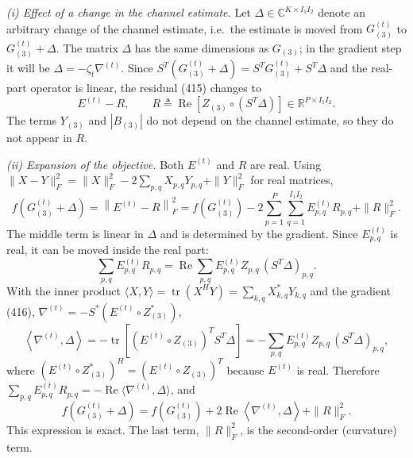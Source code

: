 \documentclass[12pt,a4paper]{article}
\begin{document}
\emph{(i) Effect of a change in the channel estimate.} Let
$\Delta\in\mathbb C^{K\times I_1I_2}$ denote an arbitrary change of the
channel estimate, i.e.\ the estimate is moved from $G_{(3)}^{(t)}$ to
$G_{(3)}^{(t)}+\Delta$. The matrix $\Delta$ has the same dimensions as
$G_{(3)}$; in the gradient step it will be $\Delta=-\zeta_t\nabla^{(t)}$.
Since $S^T(G_{(3)}^{(t)}+\Delta)=S^TG_{(3)}^{(t)}+S^T\Delta$ and the real-part
operator is linear, the residual (415) changes to
\[
E^{(t)}-R,
\qquad
R\triangleq\operatorname{Re}\!\left[Z_{(3)}\circ(S^T\Delta)\right]
\in\mathbb R^{P\times I_1I_2}.
\]
The terms $Y_{(3)}$ and $|B_{(3)}|$ do not depend on the channel estimate, so
they do not appear in $R$.

\emph{(ii) Expansion of the objective.} Both $E^{(t)}$ and $R$ are real.
Using $\|X-Y\|_F^2=\|X\|_F^2-2\sum_{p,q}X_{p,q}Y_{p,q}+\|Y\|_F^2$ for real
matrices,
\[
f\!\left(G_{(3)}^{(t)}+\Delta\right)
=\left\|E^{(t)}-R\right\|_F^2
=f\!\left(G_{(3)}^{(t)}\right)
-2\sum_{p=1}^{P}\sum_{q=1}^{I_1I_2}E^{(t)}_{p,q}R_{p,q}
+\|R\|_F^2 .
\]
The middle term is linear in $\Delta$ and is determined by the gradient. Since
$E^{(t)}_{p,q}$ is real, it can be moved inside the real part:
\[
\sum_{p,q}E^{(t)}_{p,q}R_{p,q}
=\operatorname{Re}\sum_{p,q}E^{(t)}_{p,q}Z_{p,q}\,(S^T\Delta)_{p,q}.
\]
With the inner product $\langle X,Y\rangle=\operatorname{tr}(X^HY)
=\sum_{k,q}X_{k,q}^{*}Y_{k,q}$ and the gradient (416),
$\nabla^{(t)}=-S^{*}(E^{(t)}\circ Z_{(3)}^{*})$,
\[
\left\langle\nabla^{(t)},\Delta\right\rangle
=-\operatorname{tr}\!\left[(E^{(t)}\circ Z_{(3)})^{T}S^T\Delta\right]
=-\sum_{p,q}E^{(t)}_{p,q}Z_{p,q}\,(S^T\Delta)_{p,q},
\]
where $(E^{(t)}\circ Z_{(3)}^{*})^{H}=(E^{(t)}\circ Z_{(3)})^{T}$ because
$E^{(t)}$ is real. Therefore
$\sum_{p,q}E^{(t)}_{p,q}R_{p,q}
=-\operatorname{Re}\langle\nabla^{(t)},\Delta\rangle$, and
\[
f\!\left(G_{(3)}^{(t)}+\Delta\right)
=f\!\left(G_{(3)}^{(t)}\right)
+2\operatorname{Re}\left\langle\nabla^{(t)},\Delta\right\rangle
+\|R\|_F^2 .
\]
This expression is exact. The last term, $\|R\|_F^2$, is the second-order
(curvature) term.
\end{document}
